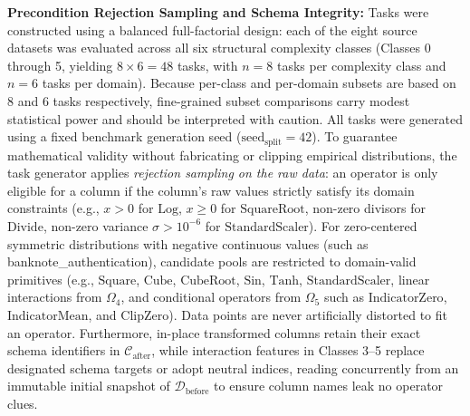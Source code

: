 \documentclass[sigconf]{acmart}
\begin{document}
\noindent\textbf{Precondition Rejection Sampling and Schema Integrity:} Tasks were constructed using a balanced full-factorial design: each of the eight source datasets was evaluated across all six structural complexity classes (Classes 0 through 5, yielding $8 \times 6 = 48$ tasks, with $n=8$ tasks per complexity class and $n=6$ tasks per domain). Because per-class and per-domain subsets are based on 8 and 6 tasks respectively, fine-grained subset comparisons carry modest statistical power and should be interpreted with caution. All tasks were generated using a fixed benchmark generation seed ($\text{seed}_{\text{split}}=42$). To guarantee mathematical validity without fabricating or clipping empirical distributions, the task generator applies \emph{rejection sampling on the raw data}: an operator is only eligible for a column if the column's raw values strictly satisfy its domain constraints (e.g., $x > 0$ for $\text{Log}$, $x \ge 0$ for $\text{SquareRoot}$, non-zero divisors for $\text{Divide}$, non-zero variance $\sigma > 10^{-6}$ for $\text{StandardScaler}$). For zero-centered symmetric distributions with negative continuous values (such as \textsf{banknote\_authentication}), candidate pools are restricted to domain-valid primitives (e.g., $\text{Square}$, $\text{Cube}$, $\text{CubeRoot}$, $\text{Sin}$, $\text{Tanh}$, $\text{StandardScaler}$, linear interactions from $\Omega_4$, and conditional operators from $\Omega_5$ such as $\text{IndicatorZero}$, $\text{IndicatorMean}$, and $\text{ClipZero}$). Data points are never artificially distorted to fit an operator. Furthermore, in-place transformed columns retain their exact schema identifiers in $\mathcal{C}_{\text{after}}$, while interaction features in Classes 3--5 replace designated schema targets or adopt neutral indices, reading concurrently from an immutable initial snapshot of $\mathcal{D}_{\text{before}}$ to ensure column names leak no operator clues.
\end{document}
